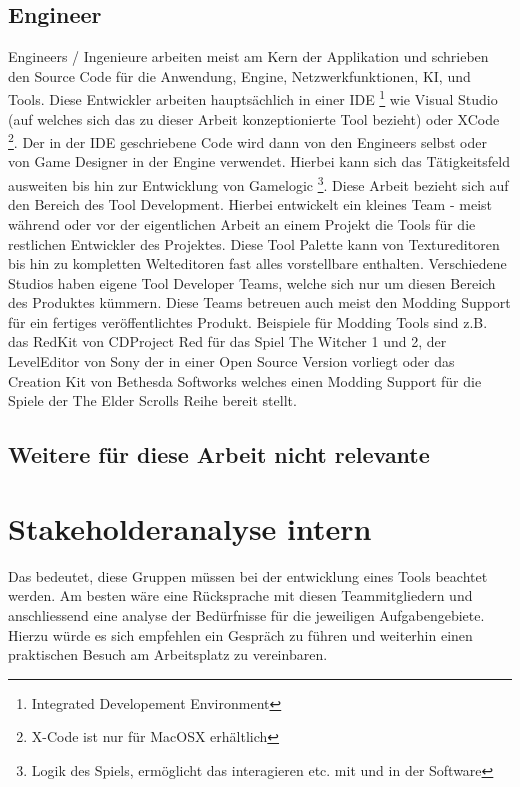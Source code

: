 \documentclass[pagesize, paper=a4, fontsize=12pt,titlepage=true, headings=small, headnosepline, abstractoff, liststotoc, nochapterprefix, plainheadsepline, twoside]{scrreprt}
\begin{document}
\subsection{Engineer}
Engineers / Ingenieure arbeiten meist am Kern der Applikation und schrieben den Source Code für die Anwendung, Engine, Netzwerkfunktionen, KI, und Tools. Diese Entwickler arbeiten hauptsächlich in einer IDE \footnote{Integrated Developement Environment} wie Visual Studio (auf welches sich das zu dieser Arbeit konzeptionierte Tool bezieht) oder XCode \footnote{X-Code ist nur für MacOSX erhältlich}. Der in der IDE geschriebene Code wird dann von den Engineers selbst oder von Game Designer in der Engine verwendet. Hierbei kann sich das Tätigkeitsfeld ausweiten bis hin zur Entwicklung von Gamelogic \footnote{Logik des Spiels, ermöglicht das interagieren etc. mit und in der Software}.
Diese Arbeit bezieht sich auf den Bereich des Tool Development. Hierbei entwickelt ein kleines Team - meist während oder vor der eigentlichen Arbeit an einem Projekt die Tools für die restlichen Entwickler des Projektes. Diese Tool Palette kann von Textureditoren bis hin zu kompletten Welteditoren fast alles vorstellbare enthalten. Verschiedene Studios haben eigene Tool Developer Teams, welche sich nur um diesen Bereich des Produktes kümmern. Diese Teams betreuen auch meist den Modding Support für ein fertiges veröffentlichtes Produkt. Beispiele für Modding Tools sind z.B. das RedKit von CDProject Red für das Spiel The Witcher 1 und 2, der LevelEditor von Sony der in einer Open Source Version vorliegt oder das Creation Kit von Bethesda Softworks welches einen Modding Support für die Spiele der The Elder Scrolls Reihe bereit stellt.
\subsection{Weitere für diese Arbeit nicht relevante}


\section{Stakeholderanalyse intern}
Das bedeutet, diese Gruppen müssen bei der entwicklung eines Tools beachtet werden. Am besten wäre eine Rücksprache mit diesen Teammitgliedern und anschliessend eine analyse der Bedürfnisse für die jeweiligen Aufgabengebiete. Hierzu würde es sich empfehlen ein Gespräch zu führen und weiterhin einen praktischen Besuch am Arbeitsplatz zu vereinbaren.
\end{document}
